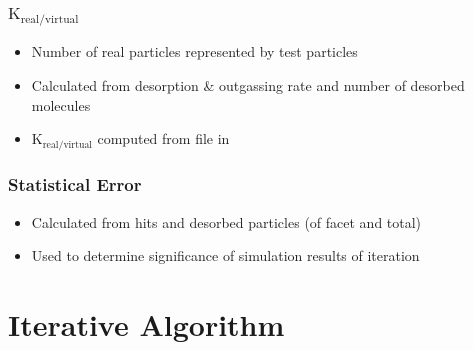 \subsubsection{$\text{K}_{\text{real}/\text{virtual}}$}
\begin{itemize}[noitemsep,topsep=0pt, partopsep=0pt]
\item Number of real particles represented by test particles
\item Calculated from desorption \& outgassing rate and number of desorbed molecules
\item $\text{K}_{\text{real}/\text{virtual}}$ computed from  file in 
\end{itemize}

\subsubsection{Statistical Error}
\begin{itemize}[noitemsep,topsep=0pt, partopsep=0pt]
\item Calculated from hits and desorbed particles (of facet and total)
\item Used to determine significance of simulation results of iteration
\end{itemize}
\section{Iterative Algorithm}


